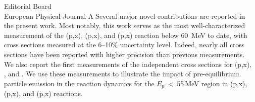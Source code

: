 \documentclass{letter} %
\begin{document}
\begin{letter}{
Editorial Board \\
European Physical Journal A}
\noindent Several major novel contributions are reported in the present work. Most notably, this work serves as the most well-characterized measurement of the (p,x), (p,x), and (p,x) reaction below 60~MeV to date, with cross sections measured  at the 6--10\% uncertainty level. 
Indeed, nearly all cross sections 
have been reported with higher precision than previous measurements.
We also report  the first measurements of the independent cross sections for (p,x), , and . 
We  use these measurements to illustrate the impact of pre-equilibrium particle emission in the reaction dynamics for the $E_p$~\textless~55\,MeV region in (p,x),  (p,x), and (p,x) reactions.







\end{letter}
\end{document}

